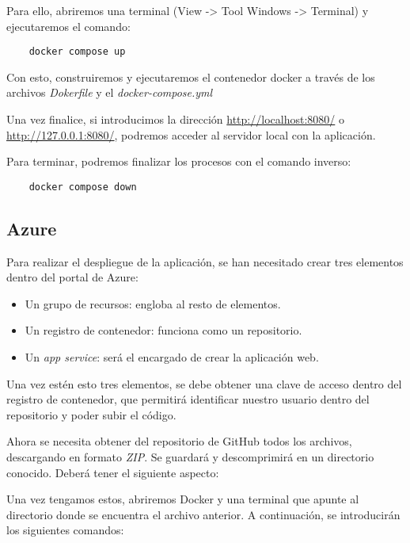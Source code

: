 Para ello, abriremos una terminal (View -> Tool Windows -> Terminal) y ejecutaremos el comando:

\begin{verbatim}
    docker compose up
\end{verbatim}

Con esto, construiremos y ejecutaremos el contenedor docker a través de los archivos \textit{Dokerfile} y el \textit{docker-compose.yml}

Una vez finalice, si introducimos la dirección \url{http://localhost:8080/} o \url{http://127.0.0.1:8080/}, podremos acceder al servidor local con la aplicación.

Para terminar, podremos finalizar los procesos con el comando inverso:
\begin{verbatim}
    docker compose down
\end{verbatim}

\subsection{Azure}
Para realizar el despliegue de la aplicación, se han necesitado crear tres elementos dentro del portal de Azure: 
\begin{itemize}
    \item Un grupo de recursos: engloba al resto de elementos.
    \item Un registro de contenedor: funciona como un repositorio.
    \item Un \textit{app service}: será el encargado de crear la aplicación web.
\end{itemize}


Una vez estén esto tres elementos, se debe obtener una clave de acceso dentro del registro de contenedor, que permitirá identificar nuestro usuario dentro del repositorio y poder subir el código.


Ahora se necesita obtener del repositorio de GitHub todos los archivos, descargando en formato \textit{ZIP}. Se guardará y descomprimirá en un directorio conocido. Deberá tener el siguiente aspecto:


Una vez tengamos estos, abriremos Docker y una terminal que apunte al directorio donde se encuentra el archivo anterior. A continuación, se introducirán los siguientes comandos:

